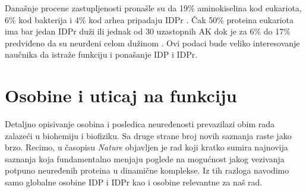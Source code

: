 Današnje procene zastupljenosti pronašle su da 19\% aminokiselina kod
eukariota, 6\% kod bakterija i 4\% kod arhea pripadaju
IDPr \parencite{peng2015b}.  Čak 50\% proteina eukariota ima bar jedan IDPr duži
ili jednak od 30 uzastopnih AK \parencite{Xue2012} dok je za 6\% do 17\%
predviđeno da su neurđeni celom dužinom \parencite{tompa2002}.  Ovi podaci bude
veliko interesovanje naučnika da istraže funkciju i ponašanje IDP i IDPr.

\section {Osobine i uticaj na funkciju}

Detaljno opisivanje osobina i posledica neuređenosti prevazilazi obim rada
zalazeći u biohemiju i biofiziku. Sa druge strane broj novih saznanja raste
jako brzo. Recimo, u časopisu \textit{Nature} objavljen je rad \parencite{rebecca2018} koji
kratko sumira najnovija saznanja koja fundamentalno menjaju poglede na
mogućnost jakog vezivanja potpuno neuređenih proteina u dinamične komplekse.
Iz tih razloga navodimo samo globalne osobine IDP i IDPr kao i osobine
relevantne za naš rad.

